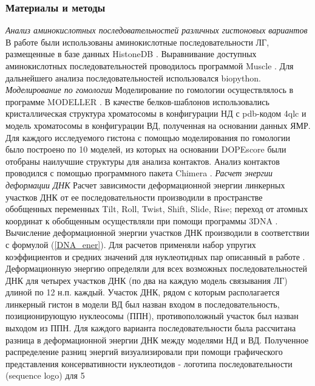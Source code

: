 \subsubsection{Материалы и методы}
\emph{Анализ аминокислотных последовательностей различных гистоновых вариантов}
В работе были использованы аминокислотные последовательности ЛГ, размещенные в базе данных HistoneDB \cite{draizen_histonedb_2016}. Выравнивание доступных аминокислотных последовательностей проводилось программой Muscle \cite{edgar_muscle_2004}. Для дальнейшего анализа последовательностей использовался biopython.
\emph{Моделирование по гомологии}
Моделирование по гомологии осуществлялось в программе MODELLER \cite{webb_comparative_2016,marti-renom_comparative_2000}. В качестве белков-шаблонов использовались кристаллическая структура хроматосомы в конфигурации НД с pdb-кодом 4qlc и модель хроматосомы в конфигурации ВД, полученная на основании данных ЯМР\cite{zhou_structural_2015}. Для каждого исследуемого гистона с помощью моделирования по гомологии было построено по 10 моделей, из которых на основании DOPEscore были отобраны наилучшие структуры для анализа контактов. Анализ контактов проводился с помощью программного пакета Chimera \cite{pettersen_ucsf_2004}.
\emph{Расчет энергии деформации ДНК}
Расчет зависимости деформационной энергии линкерных участков ДНК от ее последовательности производили в пространстве обобщенных переменных Tilt, Roll, Twist, Shift, Slide, Rise; переход от атомных координат к обобщенным осуществляли при помощи программы 3DNA \cite{lu_3dna_2003}. Вычисление деформационной энергии участков ДНК производили в соответствии с формулой (\ref{DNA_ener}). Для расчетов применяли набор упругих коэффициентов и средних значений для нуклеотидных пар описанный в работе \cite{olson_dna_1998}.  
Деформационную энергию определяли для всех возможных последовательностей ДНК для четырех участков ДНК (по два на каждую модель связывания ЛГ) длиной по 12 н.п. каждый. Участок ДНК, рядом с которым располагается линкерный гистон в модели ВД был назван входом в последовательность, позиционирующую нуклеосомы (ППН), противоположный участок был назван выходом из ППН. Для каждого варианта последовательности была рассчитана разница в деформационной энергии ДНК между моделями НД и ВД. Полученное распределение разниц энергий визуализировали при помощи графического представления консервативности нуклеотидов - логотипа последовательности (sequence logo) для 5%
